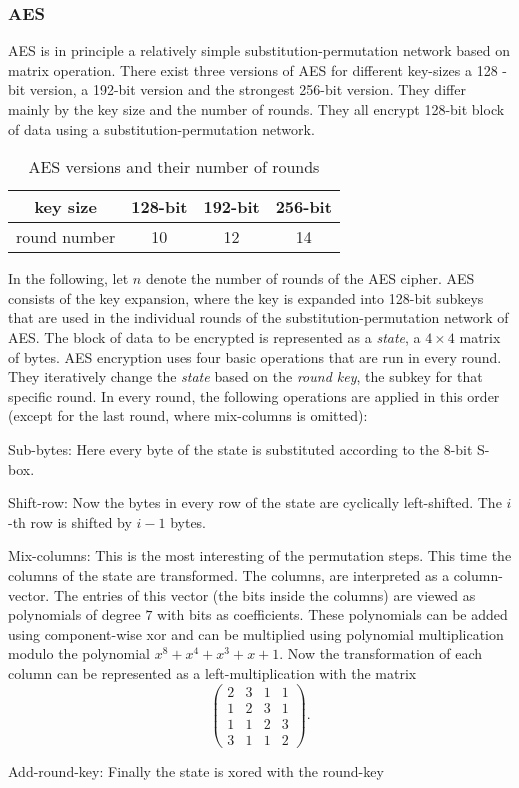 \subsubsection{AES} %
AES is in principle a relatively simple substitution-permutation network based on matrix operation. There exist three versions of AES for different key-sizes a 128 -bit version, a 192-bit version and the strongest 256-bit version. They differ mainly by the key size and the number of rounds. They all encrypt 128-bit block of data using a substitution-permutation network.\par
\begin{table}[ht]\centering
  \begin{tabular}{|c|c|c|c|}
  	\hline key size & 128-bit & 192-bit & 256-bit \\ 
  	\hline round number & 10 & 12 & 14 \\ 
  	\hline 
  \end{tabular}
  \caption{AES versions and their number of rounds}
\end{table} 
In the following, let $n$ denote the number of rounds of the AES cipher. 
AES consists of the key expansion, where the key is expanded into 128-bit subkeys that are used in the individual rounds of the substitution-permutation network of AES. The block of data to be encrypted is represented as a \emph{state}, a $4\times 4$ matrix of bytes.  
AES encryption uses four basic operations that are run in every round. They iteratively change the \emph{state} based on the \emph{round key}, the subkey for that specific round. In every round, the following operations are applied in this order (except for the last round, where mix-columns is omitted):
\begin{compactenum}
  \item Sub-bytes: Here every byte of the state is substituted according to the 8-bit S-box. 
  \item Shift-row: Now the bytes in every row of the state are cyclically left-shifted. The $i$-th row is shifted by $i-1$ bytes. 
  \item Mix-columns: This is the most interesting of the permutation steps. This time the columns of the state are transformed. The columns, are interpreted as a column-vector. The entries of this vector (the bits inside the columns) are viewed as polynomials of degree $7$ with bits as coefficients. These polynomials can be added using component-wise xor and can be multiplied using polynomial multiplication modulo the polynomial $x^8+x^4+x^3+x+1$. Now the transformation of each column can be represented as a left-multiplication with the matrix $$\left(\begin{matrix}
    2&3&1&1\\1&2&3&1\\1&1&2&3\\3&1&1&2
  \end{matrix}\right).$$
  \item Add-round-key: Finally the state is xored with the round-key   
\end{compactenum}
